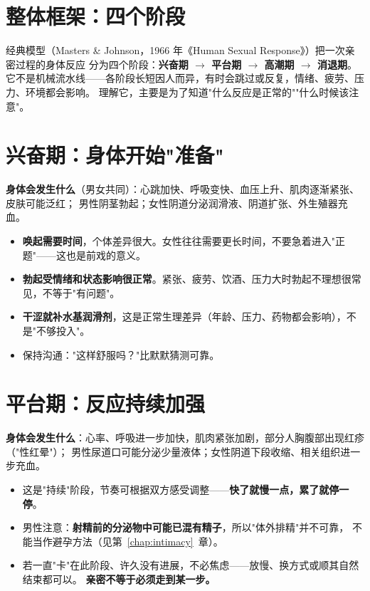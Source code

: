 \documentclass[12pt,UTF8,openany]{ctexbook}
\begin{document}
\section{整体框架：四个阶段}

经典模型（Masters \& Johnson，1966 年《Human Sexual Response》）把一次亲密过程的身体反应
分为四个阶段：\textbf{兴奋期 $\to$ 平台期 $\to$ 高潮期 $\to$ 消退期}。
它不是机械流水线——各阶段长短因人而异，有时会跳过或反复，情绪、疲劳、压力、环境都会影响。
理解它，主要是为了知道"什么反应是正常的""什么时候该注意"。

\section{兴奋期：身体开始"准备"}

\textbf{身体会发生什么}（男女共同）：心跳加快、呼吸变快、血压上升、肌肉逐渐紧张、皮肤可能泛红；
男性阴茎勃起；女性阴道分泌润滑液、阴道扩张、外生殖器充血。

\begin{itemize}[leftmargin=2em]
  \item \textbf{唤起需要时间}，个体差异很大。女性往往需要更长时间，不要急着进入"正题"——这也是前戏的意义。
  \item \textbf{勃起受情绪和状态影响很正常}。紧张、疲劳、饮酒、压力大时勃起不理想很常见，不等于"有问题"。
  \item \textbf{干涩就补水基润滑剂}，这是正常生理差异（年龄、压力、药物都会影响），不是"不够投入"。
  \item 保持沟通："这样舒服吗？"比默默猜测可靠。
\end{itemize}

\section{平台期：反应持续加强}

\textbf{身体会发生什么}：心率、呼吸进一步加快，肌肉紧张加剧，部分人胸腹部出现红疹（"性红晕"）；
男性尿道口可能分泌少量液体；女性阴道下段收缩、相关组织进一步充血。

\begin{itemize}[leftmargin=2em]
  \item 这是"持续"阶段，节奏可根据双方感受调整——\textbf{快了就慢一点，累了就停一停}。
  \item 男性注意：\textbf{射精前的分泌物中可能已混有精子}，所以"体外排精"并不可靠，
        不能当作避孕方法（见第~\ref{chap:intimacy}~章）。
  \item 若一直"卡"在此阶段、许久没有进展，不必焦虑——放慢、换方式或顺其自然结束都可以。
        \textbf{亲密不等于必须走到某一步。}
\end{itemize}
\end{document}
